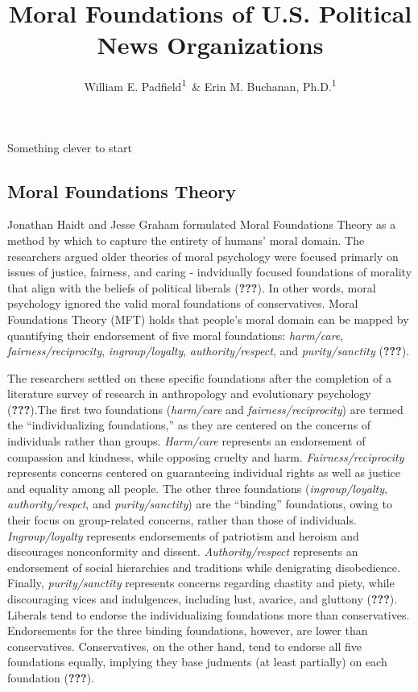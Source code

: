 \documentclass[,man]{apa6}
\title{Moral Foundations of U.S. Political News Organizations}
\author{William E. Padfield\textsuperscript{1}~\& Erin M. Buchanan,
Ph.D.\textsuperscript{1}}
\date{}
\affiliation{
\vspace{0.5cm}
\textsuperscript{1} Missouri State University}
\theoremstyle{definition}
\theoremstyle{definition}
\theoremstyle{definition}
\theoremstyle{remark}
\begin{document}
\maketitle

Something clever to start

\hypertarget{moral-foundations-theory}{%
\subsection{Moral Foundations Theory}\label{moral-foundations-theory}}

Jonathan Haidt and Jesse Graham formulated Moral Foundations Theory as a
method by which to capture the entirety of humans' moral domain. The
researchers argued older theories of moral psychology were focused
primarly on issues of justice, fairness, and caring - indvidually
focused foundations of morality that align with the beliefs of political
liberals ({\textbf{???}}). In other words, moral psychology ignored the
valid moral foundations of conservatives. Moral Foundations Theory (MFT)
holds that people's moral domain can be mapped by quantifying their
endorsement of five moral foundations: \emph{harm/care},
\emph{fairness/reciprocity}, \emph{ingroup/loyalty},
\emph{authority/respect}, and \emph{purity/sanctity} ({\textbf{???}}).

The researchers settled on these specific foundations after the
completion of a literature survey of research in anthropology and
evolutionary psychology ({\textbf{???}}).The first two foundations
(\emph{harm/care} and \emph{fairness/reciprocity}) are termed the
\enquote{individualizing foundations,} as they are centered on the
concerns of individuals rather than groups. \emph{Harm/care} represents
an endorsement of compassion and kindness, while opposing cruelty and
harm. \emph{Fairness/reciprocity} represents concerns centered on
guaranteeing individual rights as well as justice and equality among all
people. The other three foundations (\emph{ingroup/loyalty},
\emph{authority/respct}, and \emph{purity/sanctity}) are the
\enquote{binding} foundations, owing to their focus on group-related
concerns, rather than those of individuals. \emph{Ingroup/loyalty}
represents endorsements of patriotism and heroism and discourages
nonconformity and dissent. \emph{Authority/respect} represents an
endorsement of social hierarchies and traditions while denigrating
disobedience. Finally, \emph{purity/sanctity} represents concerns
regarding chastity and piety, while discouraging vices and indulgences,
including lust, avarice, and gluttony ({\textbf{???}}). Liberals tend to
endorse the individualizing foundations more than conservatives.
Endorsements for the three binding foundations, however, are lower than
conservatives. Conservatives, on the other hand, tend to endorse all
five foundations equally, implying they base judments (at least
partially) on each foundation ({\textbf{???}}).
\end{document}
